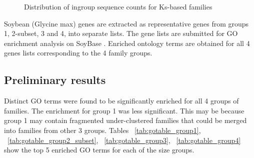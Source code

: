 \documentclass{article}
\begin{document}
		\begin{figure}[h!]
			\caption{Distribution of ingroup sequence counts for Ks-based families}
			\label{fig:hist_lgf5_family_size_groups}
		\end{figure}
	
		Soybean (Glycine max) genes are extracted as representative genes from groups 1, 2-subset, 3 and 4, into separate lists. The gene lists are submitted for GO enrichment analysis on SoyBase \citep{grant2009soybase}. Enriched ontology terms are obtained for all 4 genes lists corresponding to the 4 family groups.
		
		\subsection{Preliminary results}
		Distinct GO terms were found to be significantly enriched for all 4 groups of families. The enrichment for group 1 was less significant. This may be because group 1 may contain fragmented under-clustered families that could be merged into families from other 3 groups. Tables ~\ref{tab:gotable_group1}, ~\ref{tab:gotable_group2_subset}, ~\ref{tab:gotable_group3}, ~\ref{tab:gotable_group4} show the top 5 enriched GO terms for each of the size groups.
		
\end{document}
